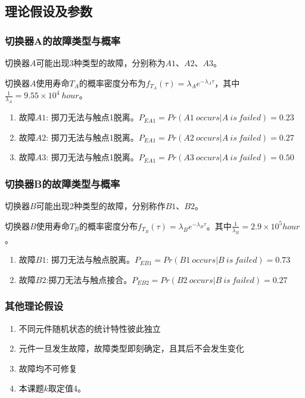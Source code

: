 \documentclass[10.5pt,twocolumn]{jbuaa}
\begin{document}
\subsection{理论假设及参数}
\subsubsection{切换器A的故障类型与概率}
切换器$A$可能出现3种类型的故障，分别称为$A1$、$A2$、$A3$。

切换器$A$使用寿命$T_A$的概率密度分布为$f_{T_A}(\tau) = \lambda_A e^{-\lambda_A \tau}$，其中$\frac{1}{\lambda_A} = 9.55 \times 10 ^ 4\ hour$。
\begin{enumerate}
	\item 故障$A1$: 掷刀无法与触点1脱离。$P_{EA1} = Pr(A1\   occurs | A
	  \ is\ failed) = 0.23$
	\item 故障$A2$: 掷刀无法与触点1脱离。$P_{EA1} = Pr(A2\ occurs | A\ is\ failed) = 0.27$
	 \item 故障$A3$: 掷刀无法与触点1脱离。$P_{EA1} = Pr(A3\ 
	  occurs | A\ 
	  is\ failed) = 0.50$
\end{enumerate}
\subsubsection{切换器B的故障类型与概率}
切换器$B$可能出现2种类型的故障，分别称作$B1$、$B2$。

切换器$B$使用寿命$T_B$的概率密度分布$f_{T_B}(\tau) = \lambda_B e^{-\lambda_B \tau}$。其中$\frac{1}{\lambda_B} = 2.9 \times 10^ 5 hour$。
\begin{enumerate}
	\item 故障$B1$: 掷刀无法与触点脱离。$P_{EB1} = Pr(B1\ occurs | B\ is\ failed) = 0.73$
	\item 故障$B2$:掷刀无法与触点接合。$P_{EB2} = Pr(B2\ occurs | B\ is\ failed) = 0.27$
\end{enumerate}
\subsubsection{其他理论假设}
\begin{enumerate}
	\item 不同元件随机状态的统计特性彼此独立
	\item 元件一旦发生故障，故障类型即刻确定，且其后不会发生变化
	\item 故障均不可修复
	\item 本课题$k$取定值4。
\end{enumerate}
\end{document}

